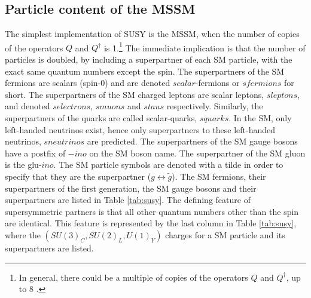 \subsection*{Particle content of the MSSM}
\noindent\justify
The simplest implementation of SUSY is the MSSM, when the number of copies of the operators $Q$ and $Q^{\dagger}$ is 1.\footnote{In general, there could be a multiple of copies of the operators $Q$ and $Q^{\dagger}$, up to 8 \cite{Haag:1974qh,Coleman:1967ad}.}
The immediate implication is that the number of particles is doubled, by including a superpartner of each SM particle, with the exact same quantum numbers except the spin. 
The superpartners of the SM fermions are scalars (spin-0) and are denoted $scalar$-fermions or $sfermions$ for short. 
The superpartners of the SM charged leptons are scalar leptons, $sleptons$, and denoted $selectrons$, $smuons$ and $staus$ respectively. 
Similarly, the superpartners of the quarks are called scalar-quarks, $squarks$. 
In the SM, only left-handed neutrinos exist, hence only superpartners to these left-handed neutrinos, $sneutrinos$ are predicted. 
The superpartners of the SM gauge bosons have a postfix of $-ino$ on the SM boson name. The superpartner of the SM gluon is the glu-$ino$. 
The SM particle symbols are denoted with a tilde in order to specify that they are the superpartner ($g\leftrightarrow\tilde{g}$). 
The SM fermions, their superpartners of the first generation, the SM gauge bosons and their superpartners are listed in Table \ref{tab:susy}.  
The defining feature of supersymmetric partners is that all other quantum numbers other than the spin are identical. 
This feature is represented by the last column in Table \ref{tab:susy}, where the $(SU(3)_{C},SU(2)_{L},U(1)_{Y})$ charges for a SM particle and its superpartners are listed. 
